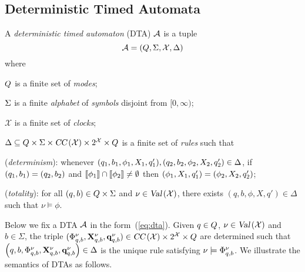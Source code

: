 \subsection{Deterministic Timed Automata}
\vspace{-0.8em}
\begin{definition}
A \emph{deterministic timed automaton} (DTA) $\mathcal{A}$ is a tuple
\begin{equation}\label{eq:dta}
\mathcal{A}=(Q,\Sigma,\mathcal{X},\Delta)
\end{equation}
where
\begin{compactitem}
\item $Q$ is a finite set of \emph{modes}; %
\item $\Sigma$ is a finite \emph{alphabet} of \emph{symbols} disjoint from $[0,\infty)$;
\item $\mathcal{X}$ is a finite set of \emph{clocks};
\item $\Delta\subseteq Q\times\Sigma\times\mbox{\sl CC}\left(\mathcal{X}\right)\times 2^{\mathcal{X}}\times Q$ is a finite set of \emph{rules} such that
\begin{compactenum}
\item ({\em determinism}): whenever $(q_1,b_1,\phi_1,X_1,q'_1),(q_2,b_2,\phi_2,X_2,q'_2)\in\Delta$, if $(q_1,b_1)=(q_2,b_2)$ and ${\llbracket}{\phi_1}{\rrbracket}\cap {\llbracket}{\phi_2}{\rrbracket}\ne\emptyset$ then $(\phi_1,X_1,q'_1)=(\phi_2,X_2,q'_2)$;
\item ({\em totality}): for all $(q,b)\in Q\times\Sigma$ and $\nu\in\mbox{\sl Val}\left(\mathcal{X}\right)$, there exists $(q,b,\phi,X,q')\in\Delta$ such that $\nu\models \phi$.
\end{compactenum}
\end{compactitem}
\end{definition}

Below we fix a DTA $\mathcal{A}$ in the form~(\ref{eq:dta}). Given $q\in Q$, $\nu\in\mbox{\sl Val}\left(\mathcal{X}\right)$ and $b\in\Sigma$, the triple $(\Phi_{q,b}^{\nu},\mathbf{X}_{q,b}^{\nu},\mathbf{q}_{q,b}^{\nu})\in\mbox{\sl CC}\left(\mathcal{X}\right)\times 2^{\mathcal{X}}\times Q$ are determined such that $\left(q,b,\Phi_{q,b}^{\nu},\mathbf{X}_{q,b}^{\nu},\mathbf{q}_{q,b}^{\nu}\right)\in\Delta$ is the unique rule satisfying $\nu\models \Phi_{q,b}^{\nu}$.
We illustrate the semantics of DTAs as follows.

